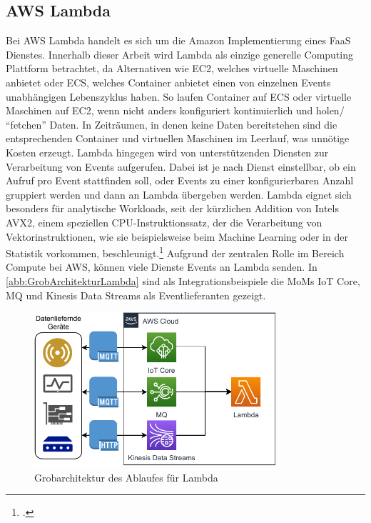 \subsection{AWS Lambda}
Bei \ac{AWS} Lambda handelt es sich um die Amazon Implementierung eines \ac{FaaS} Dienstes. Innerhalb dieser Arbeit wird Lambda als einzige generelle Computing Plattform betrachtet, da Alternativen wie \ac{EC2}, welches virtuelle Maschinen anbietet oder \ac{ECS}, welches Container anbietet einen von einzelnen Events unabhängigen Lebenszyklus haben. So laufen Container auf \ac{ECS} oder virtuelle Maschinen auf \ac{EC2}, wenn nicht anders konfiguriert kontinuierlich und holen/ \enquote{fetchen} Daten. In Zeiträumen, in denen keine Daten bereitstehen sind die entsprechenden Container und virtuellen Maschinen im Leerlauf, was unnötige Kosten erzeugt. Lambda hingegen wird von unterstützenden Diensten zur Verarbeitung von Events aufgerufen. Dabei ist je nach Dienst einstellbar, ob ein Aufruf pro Event stattfinden soll, oder Events zu einer konfigurierbaren Anzahl gruppiert werden und dann an Lambda übergeben werden. Lambda eignet sich besonders für analytische Workloads, seit der kürzlichen Addition von Intels \ac{AVX2}, einem speziellen CPU-Instruktionssatz, der die Verarbeitung von Vektorinstruktionen, wie sie beispielsweise beim Machine Learning oder in der Statistik vorkommen, beschleunigt.\footcite[Vgl.][]{Beswick.24.11.2020} Aufgrund der zentralen Rolle im Bereich Compute bei \ac{AWS}, können viele Dienste Events an Lambda senden. In \autoref{abb:GrobArchitekturLambda} sind als Integrationsbeispiele die \acp{MoM} \ac{IoT} Core, MQ und Kinesis Data Streams als Eventlieferanten gezeigt.
\begin{figure}[H]
\centering
\includegraphics[width=0.8\textwidth]{graphics/Lambda-general.pdf}
\caption{Grobarchitektur des Ablaufes für Lambda}
\label{abb:GrobArchitekturLambda}
\end{figure}

